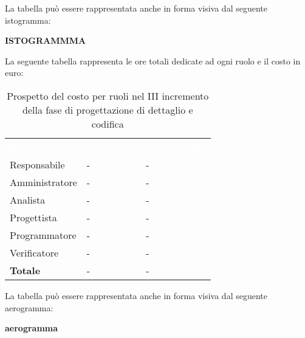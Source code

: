 La tabella può essere rappresentata anche in forma visiva dal seguente istogramma:

\textbf{ISTOGRAMMMA}


La seguente tabella rappresenta le ore totali dedicate ad ogni ruolo e il costo in euro:

\begin{table}[!htbp]
\begin{center}
\renewcommand{\arraystretch}{1.5}
\begin{tabular}{ m{}<{\centering}  m{}<{\centering} m{}<{\centering}}
	\rowcolor{darkblue}
	\textcolor{white}{\textbf{Ruolo}}&\textcolor{white}{\textbf{Totale ore}}&\textcolor{white}{\textbf{Costo totale}}\\ 

	Responsabile  & - & - \\	

	Amministratore & - & - \\
	
	Analista & - & - \\
	
	Progettista & - & - \\
	
	Programmatore & - & - \\
	
	Verificatore & - & - \\
	
	\textbf{Totale} & - & - \\
	
\end{tabular}
\caption{Prospetto del costo per ruoli nel III incremento della fase di progettazione di dettaglio e codifica}
\end{center}
\end{table}

La tabella può essere rappresentata anche in forma visiva dal seguente aerogramma:

\textbf{aerogramma}


